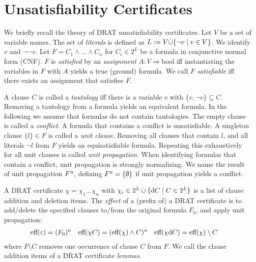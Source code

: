 \documentclass[smallcondensed]{svjour3}     %
\begin{document}
\section{Unsatisfiability Certificates}\label{sec:unsat_cert}
We briefly recall the theory of DRAT unsatisfiability certificates. 
Let $V$ be a set of variable names. The set of \emph{literals} is defined as $L := V \dot{\cup} \{\neg v \mid v\in V \}$.
We identify $v$ and $\neg\neg v$.
Let $F = C_1 \wedge \ldots \wedge C_n$ for $C_i \in 2^L$ be a formula in conjunctive normal form (CNF). 
$F$ is \emph{satisfied} by an \emph{assignment} $A : V \Rightarrow \textrm{bool}$ iff instantiating the variables in $F$ with $A$ yields a true (ground) formula.
We call $F$ \emph{satisfiable} iff there exists an assignment that satisfies $F$.

A clause $C$ is called a \emph{tautology} iff there is a variable $v$ with $\{v,\neg v\} \subseteq C$. Removing a tautology from a formula yields an equivalent formula.
In the following we assume that formulas do not contain tautologies.
The empty clause is called a \emph{conflict}. A formula that contains a conflict is unsatisfiable. 
A singleton clause $\{l\} \in F$ is called a \emph{unit clause}. Removing all clauses that contain $l$, and all literals $\neg l$ from $F$ yields an equisatisfiable formula.
Repeating this exhaustively for all unit clauses is called \emph{unit propagation}. When identifying formulas that contain a conflict, unit propagation is strongly normalizing. 
We name the result of unit propagation $F^{\textrm u}$, defining $F^{\textrm u} = \{\emptyset\}$ if unit propagation yields a conflict.

A DRAT certificate $\chi = \chi_1\ldots\chi_n$ with $\chi_i \in 2^L \mathbin{\dot\cup} \{ \textrm d C \mid C\in 2^L \}$
is a list of clause addition and deletion items.
The \emph{effect} of a (prefix of) a DRAT certificate is to add/delete the specified clauses to/from the original formula $F_0$, and apply unit propagation:
\begin{align*}
  \textrm{eff}(\varepsilon) &= (F_0)^\textrm{u}&
  \textrm{eff}(\chi C) &= (\textrm{eff}(\chi) \wedge C)^\textrm{u}&
  \textrm{eff}(\chi\textrm d C) &= \textrm{eff}(\chi) \setminus C
\end{align*}
where $F \setminus C$ removes one occurrence of clause $C$ from $F$. %
We call the clause addition items of a DRAT certificate \emph{lemmas}.
\end{document}
